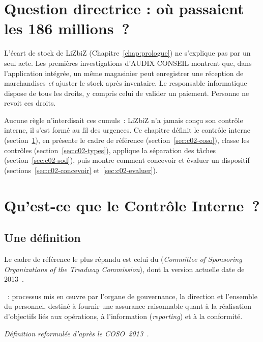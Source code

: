 \section*{Question directrice : où passaient les 186 millions~?}

L'écart de stock de LiZbiZ (Chapitre~\ref{chap:prologue}) ne s'explique
pas par un seul acte. Les premières investigations d'AUDIX CONSEIL montrent
que, dans l'application intégrée, un même magasinier peut enregistrer une
réception de marchandises \emph{et} ajuster le stock après inventaire. Le
responsable informatique dispose de tous les droits, y compris celui de
valider un paiement. Personne ne revoit ces droits.

Aucune règle n'interdisait ces cumuls~: LiZbiZ n'a jamais conçu son
contrôle interne, il s'est formé au fil des urgences. Ce chapitre définit
le contrôle interne (section~\ref{sec:c02-definition}), en présente le cadre
de référence (section~\ref{sec:c02-coso}), classe les contrôles
(section~\ref{sec:c02-types}), applique la séparation des tâches
(section~\ref{sec:c02-sod}), puis montre comment concevoir et évaluer un
dispositif (sections~\ref{sec:c02-concevoir} et~\ref{sec:c02-evaluer}).

\separateur

\section{Qu'est-ce que le Contrôle Interne~?}
\label{sec:c02-definition}

\subsection{Une définition}

Le cadre de référence le plus répandu est celui du 
(\textit{Committee of Sponsoring Organizations of the Treadway Commission}),
dont la version actuelle date de 2013~\cite{coso2013ic}.

\begin{boxdef}
~: processus mis en œuvre
par l'organe de gouvernance, la direction et l'ensemble du personnel, destiné
à fournir une assurance raisonnable quant à la réalisation d'objectifs liés
aux opérations, à l'information (\textit{reporting}) et à la conformité.
\end{boxdef}
{\small\itshape Définition reformulée d'après le COSO~2013~\cite{coso2013ic}.}

